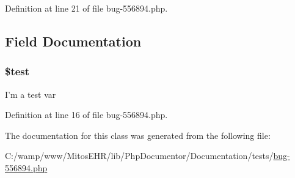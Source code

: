 \-Definition at line 21 of file bug-\/556894.\-php.


\begin{DoxyCode}
{
}
\end{DoxyCode}


\subsection{\-Field \-Documentation}
\hypertarget{classbug__556894__base_a31daebf88fc668f410293e2c70cea3fc}{
\subsubsection[{\$test}]{\setlength{\rightskip}{0pt plus 5cm}\${\bf test}}}\label{classbug__556894__base_a31daebf88fc668f410293e2c70cea3fc}
\-I'm a test var 

\-Definition at line 16 of file bug-\/556894.\-php.



\-The documentation for this class was generated from the following file\-:\begin{DoxyCompactItemize}
\item 
\-C\-:/wamp/www/\-Mitos\-E\-H\-R/lib/\-Php\-Documentor/\-Documentation/tests/\hyperlink{bug-556894_8php}{bug-\/556894.\-php}\end{DoxyCompactItemize}
